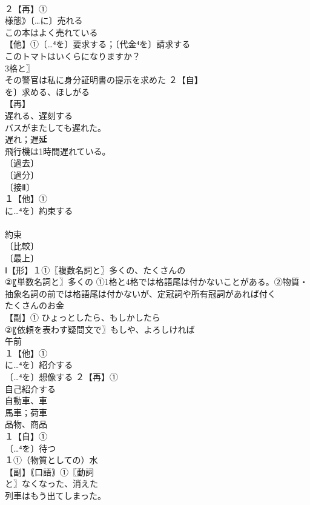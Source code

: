 \documentclass[8pt]{extreport}
\begin{document}
\begin{CJK}{UTF8}{min}
\\	２【再】①
\\	様態》〔…に〕売れる 
\\	この本はよく売れている
\\	【他】①〔…⁴を〕要求する；〔代金⁴を〕請求する
\\	このトマトはいくらになりますか？ 
\\	3格と〗
\\	その警官は私に身分証明書の提示を求めた ２【自】
\\	を〕求める、ほしがる
\\	【再】
\\	遅れる、遅刻する 
\\	バスがまたしても遅れた。
\\	遅れ；遅延
\\	飛行機は1時間遅れている。
\\	〔過去〕
\\	〔過分〕
\\	〔接Ⅱ〕
\\	１【他】①
\\	に…⁴を〕約束する
\\	[派生] 
\\	約束
\\	〔比較〕
\\	〔最上〕
\\	Ⅰ【形】１①〖複数名詞と〗多くの、たくさんの 
\\	②〖単数名詞と〗多くの ①1格と4格では格語尾は付かないことがある。②物質・抽象名詞の前では格語尾は付かないが、定冠詞や所有冠詞があれば付く 
\\	たくさんのお金
\\	【副】① ひょっとしたら、もしかしたら
\\	②〖依頼を表わす疑問文で〗もしや、よろしければ
\\	午前 
\\	１【他】①
\\	に…⁴を〕紹介する
\\	〔…⁴を〕想像する ２【再】①
\\	自己紹介する 
\\	自動車、車
\\	馬車；荷車
\\	品物、商品
\\	１【自】①
\\	〔…⁴を〕待つ
\\	１①（物質としての）水 
\\	【副】｟口語｠①〖動詞
\\	と〗なくなった、消えた 
\\	列車はもう出てしまった。 

\end{CJK}
\end{document}
